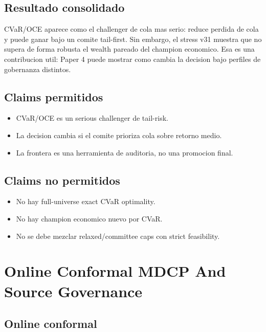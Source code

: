 \documentclass[
  spanish,
  11pt,
  letterpaper,
]{scrbook}
\providecommand{\tightlist}{%
  \setlength{\itemsep}{0pt}\setlength{\parskip}{0pt}}
\theoremstyle{plain}
\theoremstyle{remark}
\begin{document}
\section{Resultado consolidado}\label{resultado-consolidado}

CVaR/OCE aparece como el challenger de cola mas serio: reduce perdida de
cola y puede ganar bajo un comite tail-first. Sin embargo, el stress v31
muestra que no supera de forma robusta el wealth pareado del champion
economico. Esa es una contribucion util: Paper 4 puede mostrar como
cambia la decision bajo perfiles de gobernanza distintos.

\section{Claims permitidos}\label{claims-permitidos}

\begin{itemize}
\tightlist
\item
  CVaR/OCE es un serious challenger de tail-risk.
\item
  La decision cambia si el comite prioriza cola sobre retorno medio.
\item
  La frontera es una herramienta de auditoria, no una promocion final.
\end{itemize}

\section{Claims no permitidos}\label{claims-no-permitidos}

\begin{itemize}
\tightlist
\item
  No hay full-universe exact CVaR optimality.
\item
  No hay champion economico nuevo por CVaR.
\item
  No se debe mezclar relaxed/committee caps con strict feasibility.
\end{itemize}

\chapter{Online Conformal MDCP And Source
Governance}\label{online-conformal-mdcp-and-source-governance}

\section{Online conformal}\label{online-conformal}
\end{document}
